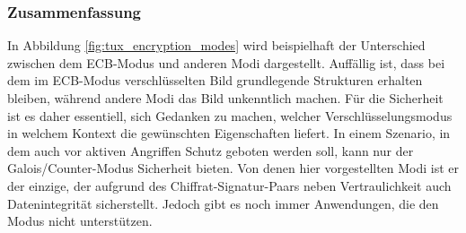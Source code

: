 \subsubsection{Zusammenfassung}
In Abbildung \ref{fig:tux_encryption_modes} wird beispielhaft der Unterschied zwischen dem ECB-Modus und anderen Modi dargestellt. Auffällig ist, dass bei dem im ECB-Modus verschlüsselten Bild grundlegende Strukturen erhalten bleiben, während andere Modi das Bild unkenntlich machen. Für die Sicherheit ist es daher essentiell, sich Gedanken zu machen, welcher Verschlüsselungsmodus in welchem Kontext die gewünschten Eigenschaften liefert. In einem Szenario, in dem auch vor aktiven Angriffen Schutz geboten werden soll, kann nur der Galois/Counter-Modus Sicherheit bieten.
Von denen hier vorgestellten Modi ist er der einzige, der aufgrund des Chiffrat-Signatur-Paars neben Vertraulichkeit auch Datenintegrität sicherstellt. Jedoch gibt es noch immer Anwendungen, die den Modus
nicht unterstützen.
